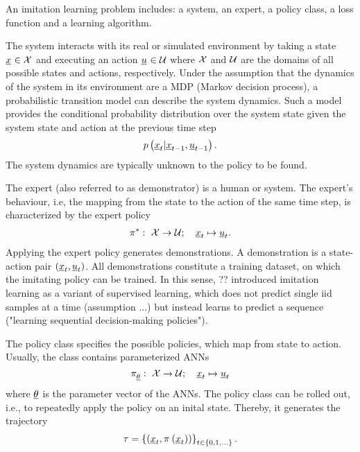 An imitation learning problem includes:
a system, an expert, a policy class, a loss function
and a learning algorithm.

The system interacts with its real or simulated environment
by taking a state $\underline{x}_{} \in \mathcal{X}$
and executing an action $\underline{u}_{} \in \mathcal{U}$
where $\mathcal{X}$ and $\mathcal{U}$ are the 
domains of all possible states and actions, respectively.
Under the assumption that the dynamics of the system in its environment
are a MDP (Markov decision process),
a probabilistic transition model can describe the system dynamics.
Such a model provides
the conditional probability distribution over the system state
given the system state and action at the previous time step 
\begin{align}
    p \left({
        \underline{x}_{t} | \underline{x}_{t -1}, \underline{u}_{t -1}
    }\right).
\end{align}
The system dynamics are typically unknown to the policy to be found.

The expert (also referred to as demonstrator) is a human or system.
The expert's behaviour, i.e,
the mapping from the state to the action of the same time step, 
is characterized by the expert policy
\begin{align}
    \pi^{*}_{}
    :\ \mathcal{X} \rightarrow \mathcal{U}
    ;\quad \underline{x}_{t} \mapsto \underline{u}_{t}
    .
\end{align}
Applying the expert policy generates demonstrations.
A demonstration is a state-action pair $\left({\underline{x}_{t}, \underline{u}_{t}}\right)$.
All demonstrations constitute a training dataset, on which the imitating policy can be trained.
In this sense, ?? introduced imitation learning as a variant of supervised learning,
which does not predict single iid samples at a time (assumption ...)
but instead learns to predict a sequence ("learning sequential decision-making policies").

The policy class specifies the possible policies, which map from state to action.
Usually, the class contains parameterized ANNs
\begin{equation}
    \pi^{}_{\underline{\theta}}
    :\ \mathcal{X} \rightarrow \mathcal{U}
    ;\quad \underline{x}_{t} \mapsto \underline{u}_{t}
\end{equation}
where $\underline{\theta}$ is the parameter vector of the ANNs.
The policy class can be rolled out, i.e.,
to repeatedly apply the policy on an inital state.
Thereby, it generates the trajectory 
\begin{align}
    \tau = \left\{{
        \left({\underline{x}_{t}, \pi^{}_{} \left({\underline{x}_{t}}\right)}\right)
    }\right\}_{t \in \left\{{0, 1, \dots}\right\}}
    .
\end{align}

